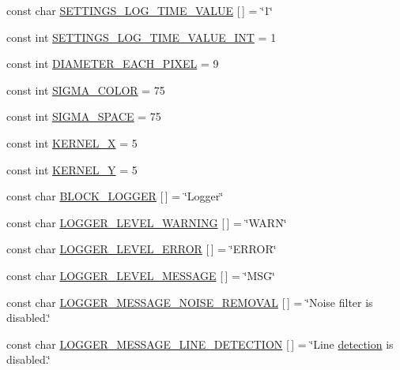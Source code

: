 \begin{DoxyCompactItemize}
\item 
const char \mbox{\hyperlink{namespaceyenot_ae00932245c3089d385ef8ee3463df8ca}{S\+E\+T\+T\+I\+N\+G\+S\+\_\+\+L\+O\+G\+\_\+\+T\+I\+M\+E\+\_\+\+V\+A\+L\+UE}} \mbox{[}$\,$\mbox{]} = \char`\"{}1\char`\"{}
\item 
const int \mbox{\hyperlink{namespaceyenot_abc8b052e7f097163709fa71c4da4478d}{S\+E\+T\+T\+I\+N\+G\+S\+\_\+\+L\+O\+G\+\_\+\+T\+I\+M\+E\+\_\+\+V\+A\+L\+U\+E\+\_\+\+I\+NT}} = 1
\item 
const int \mbox{\hyperlink{namespaceyenot_ad85720cad8409ab5ef5cc47afc84645c}{D\+I\+A\+M\+E\+T\+E\+R\+\_\+\+E\+A\+C\+H\+\_\+\+P\+I\+X\+EL}} = 9
\item 
const int \mbox{\hyperlink{namespaceyenot_affd7404833d15c98fbd85249f43f98da}{S\+I\+G\+M\+A\+\_\+\+C\+O\+L\+OR}} = 75
\item 
const int \mbox{\hyperlink{namespaceyenot_ad45191f613b95ca3398e6eab5e202406}{S\+I\+G\+M\+A\+\_\+\+S\+P\+A\+CE}} = 75
\item 
const int \mbox{\hyperlink{namespaceyenot_aa753d0e3e99fb4b37b3930996bdfe563}{K\+E\+R\+N\+E\+L\+\_\+X}} = 5
\item 
const int \mbox{\hyperlink{namespaceyenot_a33a5af73a30e2b5684ee02cc4bf4c374}{K\+E\+R\+N\+E\+L\+\_\+Y}} = 5
\item 
const char \mbox{\hyperlink{namespaceyenot_a73be0cdcde2af378cd4043f56d4776e2}{B\+L\+O\+C\+K\+\_\+\+L\+O\+G\+G\+ER}} \mbox{[}$\,$\mbox{]} = \char`\"{}Logger\char`\"{}
\item 
const char \mbox{\hyperlink{namespaceyenot_a1133c576c0c3eebe5aa6c43529a56f21}{L\+O\+G\+G\+E\+R\+\_\+\+L\+E\+V\+E\+L\+\_\+\+W\+A\+R\+N\+I\+NG}} \mbox{[}$\,$\mbox{]} = \char`\"{}W\+A\+RN\char`\"{}
\item 
const char \mbox{\hyperlink{namespaceyenot_a08c0d88b074bcba3b7d79d019211a1ac}{L\+O\+G\+G\+E\+R\+\_\+\+L\+E\+V\+E\+L\+\_\+\+E\+R\+R\+OR}} \mbox{[}$\,$\mbox{]} = \char`\"{}E\+R\+R\+OR\char`\"{}
\item 
const char \mbox{\hyperlink{namespaceyenot_a75d435531623705520a8bd478ae6e3ed}{L\+O\+G\+G\+E\+R\+\_\+\+L\+E\+V\+E\+L\+\_\+\+M\+E\+S\+S\+A\+GE}} \mbox{[}$\,$\mbox{]} = \char`\"{}M\+SG\char`\"{}
\item 
const char \mbox{\hyperlink{namespaceyenot_ae3c6bd195ef1c9bdcbd48e5b44e17aaf}{L\+O\+G\+G\+E\+R\+\_\+\+M\+E\+S\+S\+A\+G\+E\+\_\+\+N\+O\+I\+S\+E\+\_\+\+R\+E\+M\+O\+V\+AL}} \mbox{[}$\,$\mbox{]} = \char`\"{}Noise filter is disabled.\char`\"{}
\item 
const char \mbox{\hyperlink{namespaceyenot_a3cc24a045a30435ab78be6014ff26a16}{L\+O\+G\+G\+E\+R\+\_\+\+M\+E\+S\+S\+A\+G\+E\+\_\+\+L\+I\+N\+E\+\_\+\+D\+E\+T\+E\+C\+T\+I\+ON}} \mbox{[}$\,$\mbox{]} = \char`\"{}Line \mbox{\hyperlink{_core_8h_a0ef39a5ada0921b3abf8906957746b86}{detection}} is disabled.\char`\"{}

\end{DoxyCompactItemize}
